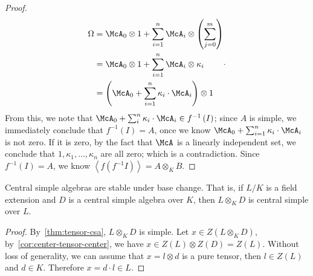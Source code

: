 \begin{proof}
  \[
    \begin{aligned}
      \Omega &= \McA_{0}\otimes 1 + \sum_{i=1}^{n}\McA_{i}\otimes\left(\sum_{j=0}^{m}\right) \\
             &= \McA_{0}\otimes 1 + \sum_{i=1}^{n}\McA_{i}\otimes\kappa_{i} \\
             &= \left(\McA_{0}+\sum_{i=1}^{n}\kappa_{i}\cdot\McA_{i}\right) \otimes 1
    \end{aligned}.
  \]
  From this, we note that
  $\McA_{0}+\sum_{i}^{n}\kappa_{i}\cdot\McA_{i}\in f^{-1}\left(I\right)$; since
  $A$ is simple, we immediately conclude that $f^{-1}\left(I\right) = A$, once
  we know $\McA_{0}+\sum_{i=1}^{n}\kappa_{i}\cdot \McA_{i}$ is not zero. If it
  is zero, by the fact that $\McA$ is a linearly independent set, we conclude
  that $1,\kappa_{1},\dots,\kappa_{n}$ are all zero; which is a contradiction.
  Since $f^{-1}\left(I\right) = A$, we know
  $\left\langle f\left(f^{-1}I\right)\right\rangle = A \otimes_{K} B$.
\end{proof}

\begin{corollary}\label{cor:csa-basechange}
  Central simple algebras are stable under base change. That is, if $L/K$ is a
  field extension and $D$ is a central simple algebra over $K$, then
  $L\otimes_{K} D$ is central simple over $L$. \leanok
\end{corollary}

\begin{proof}
  By~\cref{thm:tensor-csa}, $L\otimes_{K} D$ is simple. Let
  $x\in Z\left(L\otimes_{K}D\right)$, by~\cref{cor:center-tensor-center}, we
  have $x\in Z\left(L\right)\otimes Z\left(D\right)=Z\left(L\right)$. Without
  loss of generality, we can assume that $x = l \otimes d$ is a pure tensor,
  then $l \in Z\left(L\right)$ and $d \in K$. Therefore $x = d\cdot l \in L$.
\end{proof}

